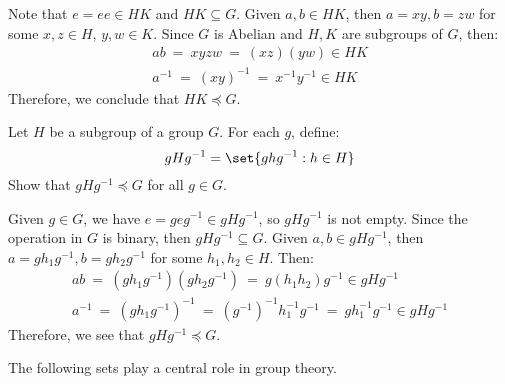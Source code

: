 \documentclass{article}
\begin{document}
\vspace{-0.3in}
\begin{soln}[source=Primary Source Material]
Note that $ e = ee \in HK $ and $ HK \subseteq G $. Given $ a, b \in HK $, then $ a = xy, b = zw $ for some $ x, z \in H $, $ y, w \in K $. Since $ G $ is Abelian and $ H, K $ are subgroups of $ G $, then:
\begin{gather*}
ab \ = \ xyzw \ = \ (xz)(yw) \in HK \\
a^{-1} \ = \ (xy)^{-1} \ = \ x^{-1}y^{-1} \in HK
\end{gather*}
Therefore, we conclude that $ HK \preceq G $.
\end{soln}

\begin{prb}[source=Primary Source Material]
Let $ H $ be a subgroup of a group $ G $. For each $ g $, define:
\begin{equation*}
gHg^{-1} = \set{ghg^{-1} : h \in H}
\end{equation*}
Show that $ gHg^{-1} \preceq G $ for all $ g \in G $.
\end{prb}

\begin{soln}[source=Primary Source Material]
Given $ g \in G $, we have $ e = geg^{-1} \in gHg^{-1} $, so $ gHg^{-1} $ is not empty. Since the operation in $ G $ is binary, then $ gHg^{-1} \subseteq G $. \vsp
Given $ a, b \in gHg^{-1} $, then $ a = gh_{1}g^{-1}, b = gh_{2}g^{-1} $ for some $ h_{1}, h_{2} \in H $. Then:
\begin{gather*}
ab \ = \ (gh_{1}g^{-1})(gh_{2}g^{-1}) \ = \ g(h_{1}h_{2})g^{-1} \in gHg^{-1} \\
a^{-1} \ = \ (gh_{1}g^{-1})^{-1} \ = \ (g^{-1})^{-1}h_{1}^{-1}g^{-1} \ = \ gh_{1}^{-1}g^{-1} \in gHg^{-1}
\end{gather*}
Therefore, we see that $ gHg^{-1} \preceq G $.
\end{soln}

The following sets play a central role in group theory.
\end{document}
